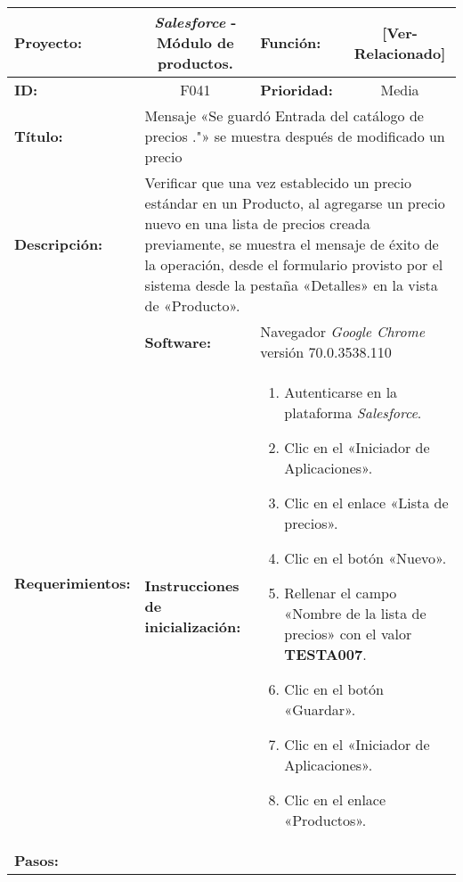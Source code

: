 \begin{table}[H]
\centering
\begin{tabular}{|p{2.5cm}|p{2.8cm}|p{2.2cm}|p{2.8cm}|p{2.2cm}|}
\hline
\footnotesize{\textbf{Proyecto:}} &
\multicolumn{2}{c|}{\footnotesize{\emph{Salesforce} - Módulo de productos.}} &
\footnotesize{\textbf{Función:}} &
\multicolumn{1}{c|}{\footnotesize{[Ver-Relacionado]}} \\
\hline
\footnotesize{\textbf{ID:}} & \multicolumn{2}{c|}{\footnotesize{F041}} &
\footnotesize{\textbf{Prioridad:}} &
\multicolumn{1}{c|}{\footnotesize{Media}} \\
\hline
\footnotesize{\textbf{Título:}} &
\multicolumn{4}{p{12.4cm}|}{\footnotesize{Mensaje «Se guardó Entrada del
catálogo de precios ."» se muestra después de modificado un precio}} \\
\hline
\footnotesize{\textbf{Descripción:}} &
\multicolumn{4}{p{12.4cm}|}{\footnotesize{Verificar que una vez establecido un
precio estándar en un Producto, al agregarse un precio nuevo en una lista de
precios creada previamente, se muestra el mensaje de éxito de la operación,
desde el formulario provisto por el sistema desde la pestaña «Detalles» en la
vista de «Producto».}} \\
\hline
\multirow{2}{*}{\footnotesize{\textbf{Requerimientos:}}} &
\footnotesize{\textbf{Software:}} &
\multicolumn{3}{p{7.8cm}|}{\footnotesize{Navegador \emph{Google Chrome}
versión 70.0.3538.110}} \\
\cline{2-5}
& \footnotesize{\textbf{Instrucciones de inicialización:}} &
\multicolumn{3}{p{7.8cm}|}{\footnotesize{
\begin{enumerate}
\item Autenticarse en la plataforma \emph{Salesforce}.
\item Clic en el «Iniciador de Aplicaciones».
\item Clic en el enlace «Lista de precios».
\item Clic en el botón «Nuevo».
\item Rellenar el campo «Nombre de la lista de precios» con el valor
    \textbf{TESTA007}.
\item Clic en el botón «Guardar».
\item Clic en el «Iniciador de Aplicaciones».
\item Clic en el enlace «Productos».
\end{enumerate}
}} \\
\hline
\footnotesize{\textbf{Pasos:}} &
\multicolumn{4}{p{11.8cm}|}{\footnotesize{
\begin{enumerate}

\end{enumerate}}}
\end{tabular}
\end{table}
